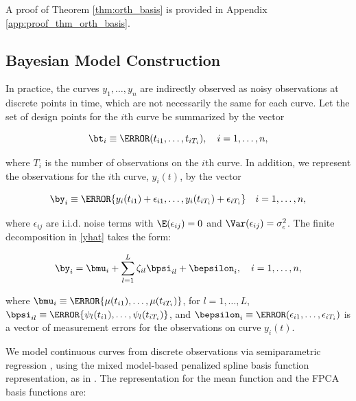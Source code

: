 \documentclass[12pt]{article}
\def\sigsqeps{\sigma^2_{\epsilon}}
\theoremstyle{plain}
\theoremstyle{definition}
\theoremstyle{remark}
\begin{document}
\noindent A proof of Theorem \ref{thm:orth_basis} is provided in Appendix \ref{app:proof_thm_orth_basis}.


\subsection{Bayesian Model Construction}
\label{sec:bayes_mod}

In practice, the curves $y_1, \dots, y_n$ are indirectly observed as noisy observations at discrete points in time,
which are not necessarily the same for each curve.
Let the set of design points for the $i$th curve be summarized by the vector

\begin{equation}
	\bt_i \equiv \T{(t_{i1}, \dots, t_{iT_i})}, \quad i = 1, \dots, n,
\label{t_i}
\end{equation}

\noindent where $T_i$ is the number of observations on the $i$th curve. In addition, we represent the
observations for the $i$th curve, $y_i (t)$, by the vector

\begin{equation}
	\by_i \equiv \T{\{ y_i (t_{i1}) + \epsilon_{i1}, \dots, y_i (t_{iT_i}) + \epsilon_{iT_i} \}} \quad i = 1, \dots, n,
\label{disc_obs}
\end{equation}

\noindent where $\epsilon_{ij}$ are i.i.d. noise terms with $\E (\epsilon_{ij}) = 0$ and $\Var (\epsilon_{ij}) = \sigsqeps$.
The finite decomposition in \eqref{yhat} takes the form:

\begin{equation}
	\by_i = \bmu_i + \sum_{l=1}^L \zeta_{il} \bpsi_{il} + \bepsilon_{i}, \quad i = 1, \dots, n,
\label{resp_mod}
\end{equation}

\noindent where $\bmu_i \equiv \T{\{ \mu (t_{i1}), \dots, \mu (t_{iT_i}) \}}$, for $l = 1, \dots, L$,
$\bpsi_{il} \equiv \T{\{ \psi_l (t_{i1}), \dots, \psi_l (t_{iT_i}) \}}$, and
$\bepsilon_{i} \equiv \T{(\epsilon_{i1}, \dots, \epsilon_{iT_i})}$ is a vector of measurement errors
for the observations on curve $y_i (t)$.

We model continuous curves from discrete observations via semiparametric regression \cite{ruppert03, ruppert09},
using the mixed model-based penalized spline basis function representation, as in . The
representation for the mean function and the FPCA basis functions are:
\end{document}
